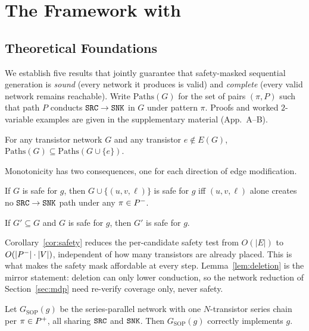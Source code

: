 \section{The \method{} Framework with \sgpn}
\label{sec:method}

\subsection{Theoretical Foundations}
\label{sec:theory}

We establish five results that jointly guarantee that safety-masked sequential
generation is \emph{sound} (every network it produces is valid) and
\emph{complete} (every valid network remains reachable).
Write $\mathrm{Paths}(G)$ for the set of pairs $(\pi, P)$ such that path $P$
conducts $\texttt{SRC} \to \texttt{SNK}$ in $G$ under pattern $\pi$.
Proofs and worked $2$-variable examples are given in the supplementary
material (App.~A--B).

\begin{theorem}
\label{thm:mono}
For any transistor network $G$ and any transistor $e \notin E(G)$,
$\mathrm{Paths}(G) \subseteq \mathrm{Paths}(G \cup \{e\})$.
\end{theorem}

\noindent
Monotonicity has two consequences, one for each direction of edge
modification.

\begin{corollary}
\label{cor:safety}
If $G$ is safe for $g$, then $G \cup \{(u,v,\ell)\}$ is safe for $g$ iff
$(u,v,\ell)$ alone creates no $\texttt{SRC} \to \texttt{SNK}$ path under any $\pi \in P^{-}$.
\end{corollary}

\begin{lemma}
\label{lem:deletion}
If $G' \subseteq G$ and $G$ is safe for $g$, then $G'$ is safe for $g$.
\end{lemma}

\noindent
Corollary~\ref{cor:safety} reduces the per-candidate safety test from
$O(|E|)$ to $O(|P^{-}| \cdot |V|)$, independent of how many transistors are
already placed.  This is what makes the safety mask affordable at every step. Lemma~\ref{lem:deletion} is the mirror statement: deletion can only
lower conduction, so the network reduction of Section~\ref{sec:mdp} need
re-verify coverage only, never safety.

\begin{theorem}
\label{thm:sop}
Let $G_{\mathrm{SOP}}(g)$ be the series-parallel network with one
$N$-transistor series chain per $\pi \in P^{+}$, all sharing $\texttt{SRC}$ and $\texttt{SNK}$.
Then $G_{\mathrm{SOP}}(g)$ correctly implements $g$.
\end{theorem}

